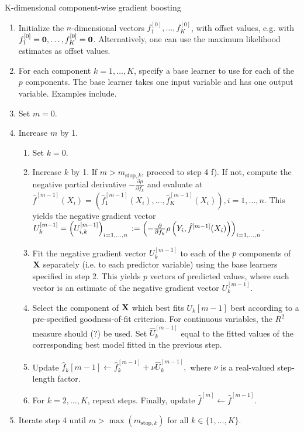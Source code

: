 \begin{algorithm}
\caption{K-dimensional component-wise gradient boosting}
\label{algo:multidim-boost}
\begin{enumerate}
    \item Initialize the $n$-dimensional vectors $f_1^{[0]},\ldots,f_K^{[0]}$, with offset values, e.g. with $f_1^{[0]}=\mathbf{0},\ldots,f_K^{[0]}=\mathbf{0}$. Alternatively, one can use the maximum likelihood estimates as offset values.
    \item For each component $k=1,\ldots,K$, specify a base learner to use for each of the $p$ components. The base learner takes one input variable and has one output variable. Examples include.
    \item Set $m=0$.
    \item Increase $m$ by 1.
    \begin{enumerate}
        \item Set $k=0$.
        \item Increase $k$ by 1. If $m>m_{\text{stop},k}$, proceed to step 4 f). If not, compute the negative partial derivative $-\frac{\partial\rho}{\partial f_k}$ and evaluate at $\hat{f}^{[m-1]}(X_i)=\left(\hat{f}_1^{[m-1]}(X_i),\ldots,\hat{f}_K^{[m-1]}(X_i)\right),i=1,\ldots,n$. This yields the negative gradient vector $U_k^{[m-1]}=\left(U_{i,k}^{[m-1]}\right)_{i=1,\ldots,n}
        \newline:=\left(-\frac{\partial}{\partial f_k}\rho\left(Y_i,\hat{f}^{[m-1]}(X_i)\right)\right)_{i=1,\ldots,n}$.
        \item Fit the negative gradient vector $U_k^{[m-1]}$ to each of the $p$ components of $\mathbf{X}$ separately (i.e. to each predictor variable) using the base learners specified in step 2. This yields $p$ vectors of predicted values, where each vector is an estimate of the negative gradient vector $U_k^{[m-1]}$.
        \item Select the component of $\mathbf{X}$ which best fits $U_k{[m-1]}$ best according to a pre-specified goodness-of-fit criterion. For continuous variables, the $R^2$ measure should (?) be used. Set $\hat{U}_k^{[m-1]}$ equal to the fitted values of the corresponding best model fitted in the previous step.
        \item Update $\hat{f}_k{[m-1]}\gets\hat{f}_k^{[m-1]}+\nu\hat{U}_k^{[m-1]},$ where $\nu$ is a real-valued step-length factor.
        \item For $k=2,\ldots,K$, repeat steps. Finally, update $\hat{f}^{[m]}\gets\hat{f}^{[m-1]}$.
    \end{enumerate}
    \item Iterate step 4 until $m>\max(m_{\text{stop},k})$ for all $k\in\{1,\ldots,K\}$.
\end{enumerate}
\end{algorithm}



